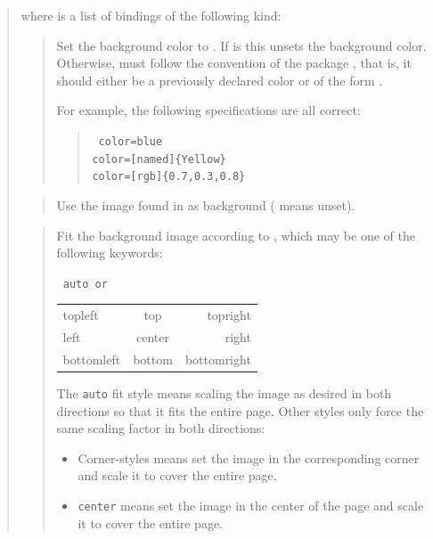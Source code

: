 \documentclass[12pt]{article}
\begin{document}
\medskip\noindent
\docdef \advibg \doctt {[global]}
\begin{quote}
where  is a list of bindings of the following kind:

\begin{quote}
Set the background color to .
If  is  this unsets the background color. 
Otherwise,  must follow the convention of the package 
, that is, it should either be a previously declared  color or 
of the form . 

For example, the following specifications are all correct:
\begin{quote}\tt
color=blue\\
color=[named]\{Yellow\}\\
color=[rgb]\{0.7,0.3,0.8\}\\
\end{quote}
\end{quote}

\begin{quote}
Use the image found in  as background ( means unset).
\end{quote}

\begin{quote}
Fit the background image according to , which may be 
one of the following keywords:
\begin{center}
\tt
auto \hfill {\rm or} \hfill
\begin{tabular}{l@{\qquad}c@{\qquad}r}
topleft&   top& topright\\
left&  center&  right \\
bottomleft& bottom & bottomright\\
\end{tabular}
\end{center}
The {\tt auto} fit style means scaling the image as desired in both directions
so that it fits the entire page. Other styles only force the same scaling
factor in both directions:
\begin {itemize}

\item Corner-styles means set the image in the corresponding corner
and scale it to cover the entire page.

\item {\tt center} means set the image in the center of the page and
scale it to cover the entire page.


\end{itemize}
\end{quote}
\end{quote}
\end{document}
